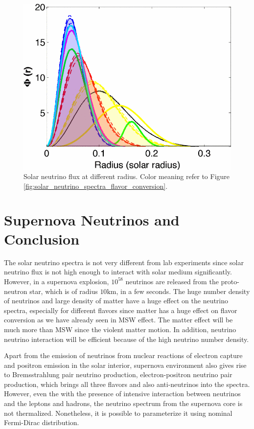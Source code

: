 \documentclass[%
 aip,
 jmp,%
 amsmath,amssymb,
 reprint,%
]{revtex4-1}
\begin{document}
\begin{figure}
\centering
\includegraphics[width=\columnwidth]{assets/solar_neutrino_production_radius.png}
\caption{Solar neutrino flux at different radius. Color meaning refer to Figure \ref{fig:solar_neutrino_spectra_flavor_conversion}.}
\label{fig:solar_neutrino_production_radius}
\end{figure}



\section{Supernova Neutrinos and Conclusion}


The solar neutrino spectra is not very different from lab experiments since solar neutrino flux is not high enough to interact with solar medium significantly. However, in a supernova explosion, $10^{58}$ neutrinos are released from the proto-neutron star, which is of radius $10\mathrm{km}$, in a few seconds. The huge number density of neutrinos and large density of matter have a huge effect on the neutrino spectra, especially for different flavors since matter has a huge effect on flavor conversion as we have already seen in MSW effect. The matter effect will be much more than MSW since the violent matter motion. In addition, neutrino neutrino interaction will be efficient because of the high neutrino number density.

Apart from the emission of neutrinos from nuclear reactions of electron capture and positron emission in the solar interior, supernova environment also gives rise to Bremsstrahlung pair neutrino production, electron-positron neutrino pair production, which brings all three flavors and also anti-neutrinos into the spectra. However, even the with the presence of intensive interaction between neutrinos and the leptons and hadrons, the neutrino spectrum from the supernova core is not thermalized. Nonetheless, it is possible to parameterize it using nominal Fermi-Dirac distribution.\cite{Keil2003}









\medskip

%

\end{document}

